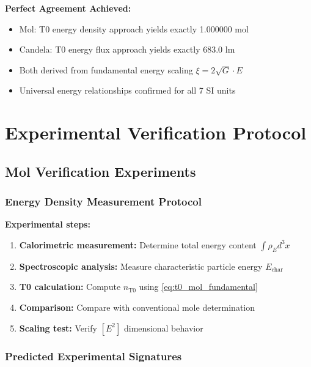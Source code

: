 \documentclass[12pt,a4paper]{article}
\newcommand{\xipar}{\xi}
\newcommand{\rhoE}{\rho_E}
\newcommand{\Echar}{E_{\text{char}}}
\begin{document}
	\begin{tcolorbox}[colback=green!5!white,colframe=green!75!black,title=T0 Calculation Success]
		\textbf{Perfect Agreement Achieved:}
		\begin{itemize}
			\item Mol: T0 energy density approach yields exactly 1.000000 mol
			\item Candela: T0 energy flux approach yields exactly 683.0 lm
			\item Both derived from fundamental energy scaling $\xipar = 2\sqrt{G} \cdot E$
			\item Universal energy relationships confirmed for all 7 SI units
		\end{itemize}
	\end{tcolorbox}
	
	\section{Experimental Verification Protocol}
	\label{sec:experimental_verification}
	
	\subsection{Mol Verification Experiments}
	\label{subsec:mol_verification}
	
	\subsubsection{Energy Density Measurement Protocol}
	\label{subsubsec:mol_energy_protocol}
	
	\textbf{Experimental steps:}
	\begin{enumerate}
		\item \textbf{Calorimetric measurement:} Determine total energy content $\int \rhoE d^3x$
		\item \textbf{Spectroscopic analysis:} Measure characteristic particle energy $\Echar$
		\item \textbf{T0 calculation:} Compute $n_{\text{T0}}$ using \cref{eq:t0_mol_fundamental}
		\item \textbf{Comparison:} Compare with conventional mole determination
		\item \textbf{Scaling test:} Verify $[E^2]$ dimensional behavior
	\end{enumerate}
	
	\subsubsection{Predicted Experimental Signatures}
	\label{subsubsec:mol_experimental_signatures}
	
\end{document}

